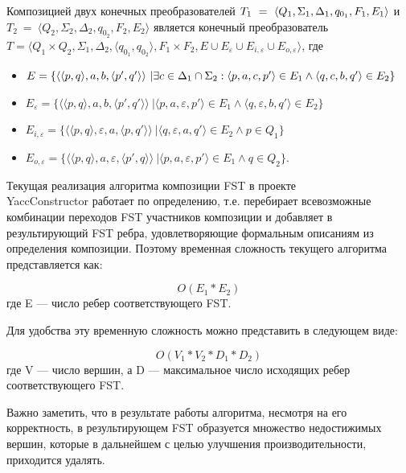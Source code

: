 \documentclass[14pt]{matmex-diploma}
\begin{document}
Композицией двух конечных преобразователей $T_1~=~\langle Q_1, \Sigma_1, \Delta_1, q_{0_{1}}, \\F_1, E_1 \rangle$ и $T_2~=~\langle Q_2, \Sigma_2, \Delta_2, q_{0_{2}}, F_2, E_2 \rangle$ является конечный преобразователь  $T =\langle Q_1  \times Q_2, \Sigma_1, \Delta_2, \langle q_{0_{1}}, q_{0_{2}} \rangle, F_1 \times F_2, E \cup E_{\varepsilon} \cup E_{i,\varepsilon} \cup E_{o,\varepsilon} \rangle$, где 

\begin{itemize}
\item $E = \{ \langle \langle p, q \rangle, a, b, \langle p', q' \rangle \rangle\ | \exists c \in \Delta_1 \cap \Sigma_2 : \langle p, a, c, p' \rangle \in E_1 \wedge \\\langle q, c, b, q' \rangle \in E_2\}$
\item $E_{\varepsilon} = \{ \langle \langle p, q \rangle, a, b, \langle p', q' \rangle \rangle\ | \langle p, a, {\varepsilon}, p' \rangle \in E_1 \wedge \langle q, {\varepsilon}, b, q' \rangle \in E_2\}$
\item $E_{i, \varepsilon} = \{ \langle \langle p, q \rangle, {\varepsilon}, a, \langle p, q' \rangle \rangle\ | \langle q, {\varepsilon}, a, q' \rangle \in E_2 \wedge p \in Q_1 \} $
\item $E_{o, \varepsilon} = \{ \langle \langle p, q \rangle,  a, {\varepsilon}, \langle p', q \rangle \rangle\ | \langle p, a, {\varepsilon}, p' \rangle \in E_1 \wedge q \in Q_2 \}. $
\end{itemize}

Текущая реализация алгоритма композиции FST в проекте\\ YaccConstructor работает по определению, т.е. перебирает всевозможные комбинации переходов FST участников композиции и добавляет в результирующий FST ребра, удовлетворяющие формальным описаниям из определения композиции. Поэтому временная сложность текущего алгоритма представляется как:

\[O(E_1 * E_2)\] где E — число ребер соответствующего FST.

Для удобства эту временную сложность можно представить в следующем виде:

\[O(V_1 * V_2 * D_1 * D_2)\] где V — число вершин, а D — максимальное число исходящих ребер соответствующего FST.

Важно заметить, что в результате работы алгоритма, несмотря на его корректность, в результирующем FST образуется множество недостижимых вершин, которые в дальнейшем с целью улучшения производительности, приходится удалять.
\end{document}
